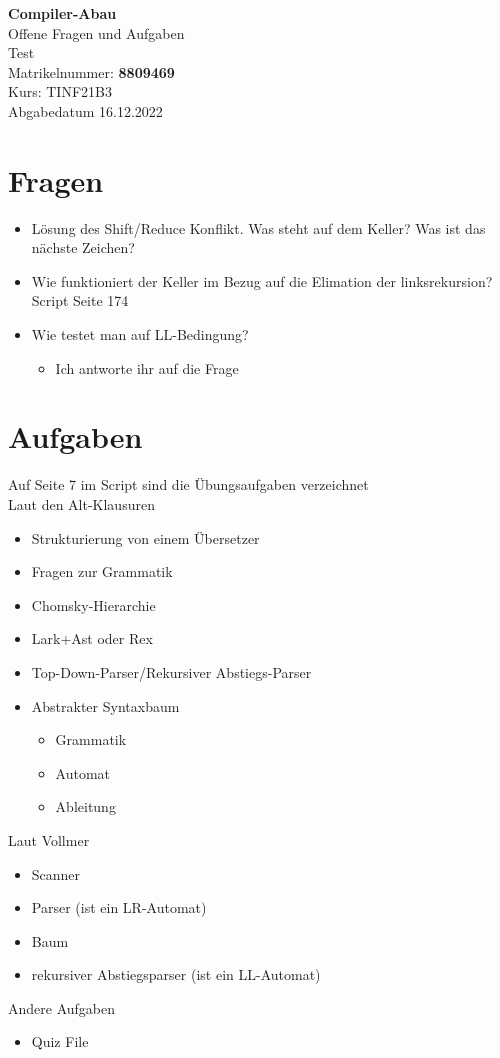 \documentclass[
  ngerman
  ,12pt
  ,pdftex
]{article}
\begin{document}
\begin{titlepage}
  \begin{center}
      {\Huge \textbf{Compiler-Abau}}\\[1.5cm]
      {\Large Offene Fragen und Aufgaben}\\[1cm]
      {\Huge Test}\\[7cm]
      {\large Matrikelnummer: \textbf{8809469}}\\[0.5cm]
      {\large Kurs: TINF21B3}\\[0.5cm]
      {\large Abgabedatum 16.12.2022}
      \vfill
  \end{center}
\end{titlepage}
\newpage
\tableofcontents
\newpage
\section{Fragen}
\begin{itemize}
  \item Lösung des Shift/Reduce Konflikt. Was steht auf dem Keller? Was ist das nächste Zeichen?
  \item Wie funktioniert der Keller im Bezug auf die Elimation der linksrekursion? Script Seite 174
  \item Wie testet man auf LL-Bedingung? 
  \begin{itemize}
    \item []  Ich antworte ihr auf die Frage  
  \end{itemize}
\end{itemize}

\section{Aufgaben}
Auf Seite 7 im Script sind die Übungsaufgaben verzeichnet\\
Laut den Alt-Klausuren
\begin{itemize}
  \item Strukturierung von einem Übersetzer
  \item Fragen zur Grammatik
  \item Chomsky-Hierarchie
  \item Lark+Ast oder Rex
  \item Top-Down-Parser/Rekursiver Abstiegs-Parser
  \item Abstrakter Syntaxbaum
  \begin{itemize}
    \item Grammatik 
    \item Automat
    \item Ableitung
  \end{itemize}
\end{itemize}
Laut Vollmer
\begin{itemize}
  \item Scanner
  \item Parser (ist ein LR-Automat)
  \item Baum
  \item rekursiver Abstiegsparser (ist ein LL-Automat)
\end{itemize}
Andere Aufgaben
\begin{itemize}
  \item Quiz File
\end{itemize}
\end{document}
